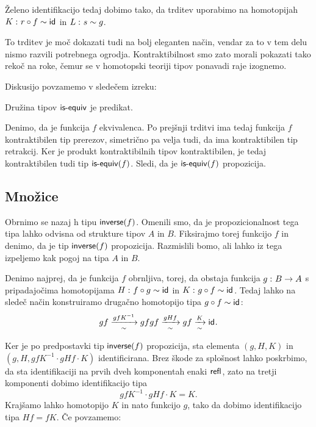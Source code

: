 \begin{dokaz}
\begin{enumerate}
Želeno identifikacijo tedaj dobimo tako, da trditev uporabimo na homotopijah \(K \,\colon r \circ f \sim \textnormal{\textsf{id}}_{}\) in \(L \,\colon s \sim g\).
\end{enumerate}
\end{dokaz}

To trditev je moč dokazati tudi na bolj eleganten način, vendar za to v tem delu nismo razvili potrebnega ogrodja. Kontraktibilnost smo zato morali pokazati tako rekoč na roke, čemur se v homotopski teoriji tipov ponavadi raje izognemo.

Diskusijo povzamemo v sledečem izreku:

\begin{izrek}
  \label{is-equiv-prop}
  Družina tipov \(\textnormal{\textsf{is-equiv}}\) je predikat.
\end{izrek}

\begin{dokaz}
  Denimo, da je funkcija \(f\) ekvivalenca. Po prejšnji trditvi ima tedaj funkcija \(f\) kontraktibilen tip prerezov, simetrično pa velja tudi, da ima kontraktibilen tip retrakcij. Ker je produkt kontraktibilnih tipov kontraktibilen, je tedaj kontraktibilen tudi tip \(\textnormal{\textsf{is-equiv}}(f)\). Sledi, da je \(\textnormal{\textsf{is-equiv}}(f)\) propozicija.
\end{dokaz}

\subsection{Množice}

Obrnimo se nazaj h tipu \(\textnormal{\textsf{inverse}}(f)\). Omenili smo, da je propozicionalnost tega tipa lahko odvisna od strukture tipov \(A\) in \(B\). Fiksirajmo torej funkcijo \(f\) in denimo, da je tip \(\textnormal{\textsf{inverse}}(f)\) propozicija. Razmislili bomo, ali lahko iz tega izpeljemo kak pogoj na tipa \(A\) in \(B\).

Denimo najprej, da je funkcija \(f\) obrnljiva, torej, da obstaja funkcija \(g \,\colon B \to A\) s pripadajočima homotopijama \(H \,\colon f \circ g \sim \textnormal{\textsf{id}}_{}\) in \(K \,\colon g \circ f \sim \textnormal{\textsf{id}}_{}\). Tedaj lahko na sledeč način konstruiramo drugačno homotopijo tipa \(g \circ f \sim \textnormal{\textsf{id}}_{}\):
\[gf \xrightarrow[\sim]{gfK^{-1}} gfgf \xrightarrow[\sim]{gHf} gf \xrightarrow[\sim]{K} \textnormal{\textsf{id}}_{}.\]

Ker je po predpostavki tip \(\textnormal{\textsf{inverse}}(f)\) propozicija, sta elementa \((g, H, K)\)
in \((g, H, gfK^{-1} \cdot gHf \cdot K)\) identificirana. Brez škode za splošnost lahko poskrbimo, da sta identifikaciji na prvih dveh komponentah enaki \(\textnormal{\textsf{refl}}_{}\), zato na tretji komponenti dobimo identifikacijo tipa \[gfK^{-1} \cdot gHf \cdot K = K.\]
Krajšamo lahko homotopijo \(K\) in nato funkcijo \(g\), tako da dobimo identifikacijo tipa \(Hf = fK\). Če povzamemo:

